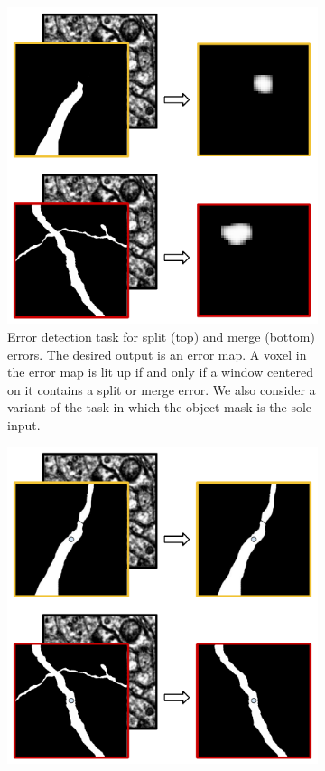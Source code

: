 \documentclass{article}
\begin{document}
\begin{figure}[t!]
	\begin{center}
	\begin{subfigure}[t]{0.45\textwidth}
		\includegraphics[width=1.0\linewidth]{detection_task.pdf}
		\caption{Error detection task for split (top) and merge (bottom) errors. The desired output is an error map. A voxel in the error map is lit up if and only if a window centered on it contains a split or merge error. We also consider a variant of the task in which the object mask is the sole input.}
		\label{fig:error_detection_cartoon}
	\end{subfigure}
\hfill
	\begin{subfigure}[t]{0.45\textwidth}
	\includegraphics[width=1.0\linewidth]{correction_task.pdf}

\end{subfigure}
\end{center}
\end{figure}
\end{document}
